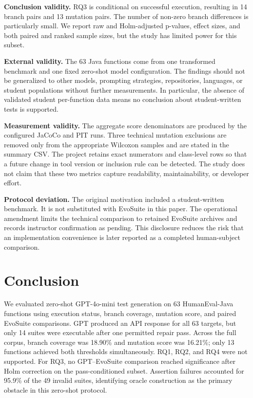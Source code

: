 ﻿\documentclass[conference]{IEEEtran}
\begin{document}
\textbf{Conclusion validity.} RQ3 is conditional on successful execution, resulting in 14 branch pairs and 13 mutation pairs. The number of non-zero branch differences is particularly small. We report raw and Holm-adjusted p-values, effect sizes, and both paired and ranked sample sizes, but the study has limited power for this subset.

\textbf{External validity.} The 63 Java functions come from one transformed benchmark and one fixed zero-shot model configuration. The findings should not be generalized to other models, prompting strategies, repositories, languages, or student populations without further measurements. In particular, the absence of validated student per-function data means no conclusion about student-written tests is supported.

\textbf{Measurement validity.} The aggregate score denominators are produced by the configured JaCoCo and PIT runs. Three technical mutation exclusions are removed only from the appropriate Wilcoxon samples and are stated in the summary CSV. The project retains exact numerators and class-level rows so that a future change in tool version or inclusion rule can be detected. The study does not claim that these two metrics capture readability, maintainability, or developer effort.

\textbf{Protocol deviation.} The original motivation included a student-written benchmark. It is not substituted with EvoSuite in this paper. The operational amendment limits the technical comparison to retained EvoSuite archives and records instructor confirmation as pending. This disclosure reduces the risk that an implementation convenience is later reported as a completed human-subject comparison.

\section{Conclusion}
\label{sec:conclusion}

We evaluated zero-shot GPT-4o-mini test generation on 63 HumanEval-Java functions using execution status, branch coverage, mutation score, and paired EvoSuite comparisons. GPT produced an API response for all 63 targets, but only 14 suites were executable after one permitted repair pass. Across the full corpus, branch coverage was 18.90\% and mutation score was 16.21\%; only 13 functions achieved both thresholds simultaneously. RQ1, RQ2, and RQ4 were not supported. For RQ3, no GPT--EvoSuite comparison reached significance after Holm correction on the pass-conditioned subset. Assertion failures accounted for 95.9\% of the 49 invalid suites, identifying oracle construction as the primary obstacle in this zero-shot protocol.
\end{document}
